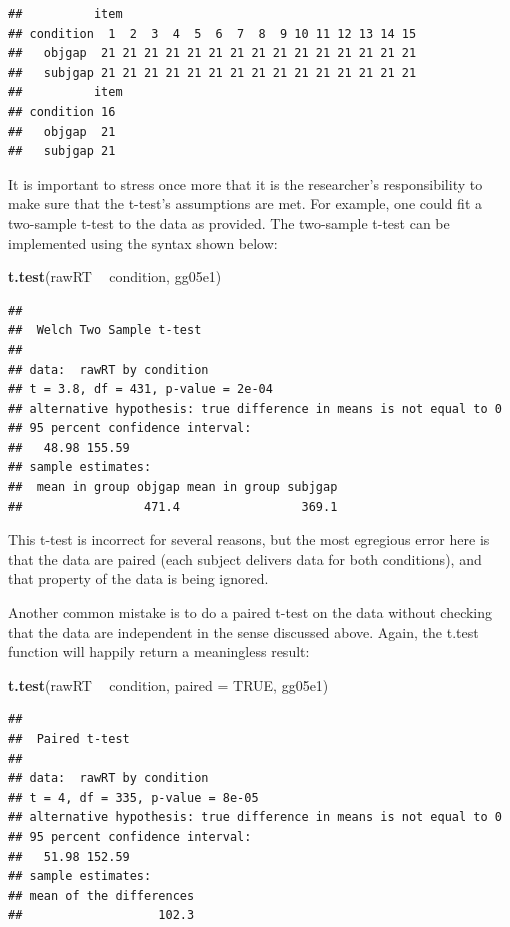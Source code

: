 \documentclass[12pt,]{krantz}
\newenvironment{Shaded}{\begin{snugshade}}{\end{snugshade}}
\newcommand{\DataTypeTok}[1]{\textcolor[rgb]{0.13,0.29,0.53}{#1}}
\newcommand{\KeywordTok}[1]{\textcolor[rgb]{0.13,0.29,0.53}{\textbf{#1}}}
\newcommand{\NormalTok}[1]{#1}
\newcommand{\OperatorTok}[1]{\textcolor[rgb]{0.81,0.36,0.00}{\textbf{#1}}}
\newcommand{\OtherTok}[1]{\textcolor[rgb]{0.56,0.35,0.01}{#1}}
\newcommand{\StringTok}[1]{\textcolor[rgb]{0.31,0.60,0.02}{#1}}
\begin{document}
\begin{verbatim}
##          item
## condition  1  2  3  4  5  6  7  8  9 10 11 12 13 14 15
##   objgap  21 21 21 21 21 21 21 21 21 21 21 21 21 21 21
##   subjgap 21 21 21 21 21 21 21 21 21 21 21 21 21 21 21
##          item
## condition 16
##   objgap  21
##   subjgap 21
\end{verbatim}

It is important to stress once more that it is the researcher's responsibility to make sure that the t-test's assumptions are met. For example, one could fit a two-sample t-test to the data as provided. The two-sample t-test can be implemented using the syntax shown below:

\begin{Shaded}
\begin{Highlighting}[]
\KeywordTok{t.test}\NormalTok{(rawRT }\OperatorTok{~}\StringTok{ }\NormalTok{condition, gg05e1)}
\end{Highlighting}
\end{Shaded}

\begin{verbatim}
## 
## 	Welch Two Sample t-test
## 
## data:  rawRT by condition
## t = 3.8, df = 431, p-value = 2e-04
## alternative hypothesis: true difference in means is not equal to 0
## 95 percent confidence interval:
##   48.98 155.59
## sample estimates:
##  mean in group objgap mean in group subjgap 
##                 471.4                 369.1
\end{verbatim}

This t-test is incorrect for several reasons, but the most egregious error here is that the data are paired (each subject delivers data for both conditions), and that property of the data is being ignored.

Another common mistake is to do a paired t-test on the data without checking that the data are independent in the sense discussed above. Again, the t.test function will happily return a meaningless result:

\begin{Shaded}
\begin{Highlighting}[]
\KeywordTok{t.test}\NormalTok{(rawRT }\OperatorTok{~}\StringTok{ }\NormalTok{condition, }\DataTypeTok{paired =} \OtherTok{TRUE}\NormalTok{, gg05e1)}
\end{Highlighting}
\end{Shaded}

\begin{verbatim}
## 
## 	Paired t-test
## 
## data:  rawRT by condition
## t = 4, df = 335, p-value = 8e-05
## alternative hypothesis: true difference in means is not equal to 0
## 95 percent confidence interval:
##   51.98 152.59
## sample estimates:
## mean of the differences 
##                   102.3
\end{verbatim}
\end{document}
